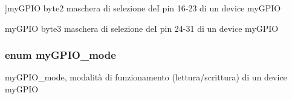 \begin{Desc}
\begin{description}
{}]my\+G\+P\+I\+O byte2 maschera di selezione de\+I pin 16-\/23 di un device my\+G\+P\+I\+O \item[{\em 
\hypertarget{group__bare-metal_gga402a0d20afc0cb7c25554b8b023f4253a1ceefb9d65397352e986c573984d0129}{my\+G\+P\+I\+O\+\_\+byte3}\label{group__bare-metal_gga402a0d20afc0cb7c25554b8b023f4253a1ceefb9d65397352e986c573984d0129}
}]my\+G\+P\+I\+O byte3 maschera di selezione de\+I pin 24-\/31 di un device my\+G\+P\+I\+O \end{description}
\end{Desc}
\hypertarget{group__bare-metal_ga76b849f0e0c05e7f9161bdb33396f2b1}{
\subsubsection[{my\+G\+P\+I\+O\+\_\+mode}]{\setlength{\rightskip}{0pt plus 5cm}enum {\bf my\+G\+P\+I\+O\+\_\+mode}}}\label{group__bare-metal_ga76b849f0e0c05e7f9161bdb33396f2b1}


my\+G\+P\+I\+O\+\_\+mode, modalità di funzionamento (lettura/scrittura) di un device my\+G\+P\+I\+O 

